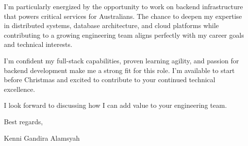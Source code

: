 \documentclass[11pt]{article}
\begin{document}
I'm particularly energized by the opportunity to work on backend infrastructure that powers critical services for Australians. The chance to deepen my expertise in distributed systems, database architecture, and cloud platforms while contributing to a growing engineering team aligns perfectly with my career goals and technical interests.

I'm confident my full-stack capabilities, proven learning agility, and passion for backend development make me a strong fit for this role. I'm available to start before Christmas and excited to contribute to your continued technical excellence.

I look forward to discussing how I can add value to your engineering team.

\vspace{1em}

\noindent
Best regards,

\vspace{2em}

\noindent
Kenni Gandira Alamsyah
\end{document}
